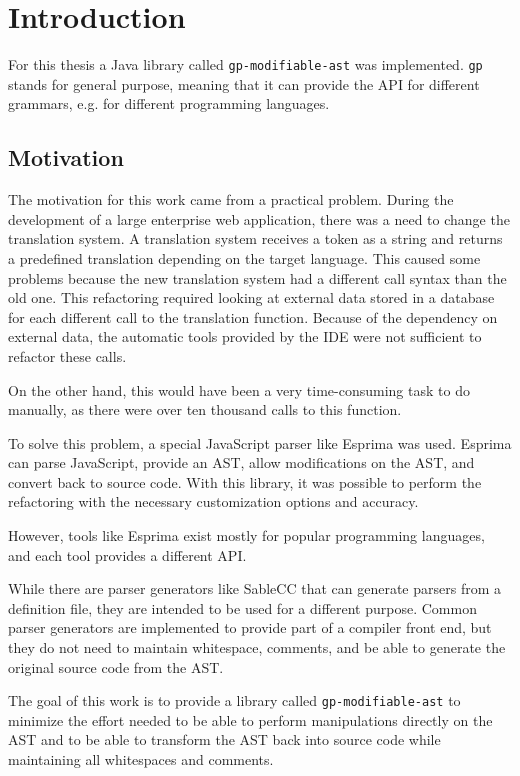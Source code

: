 \section{Introduction}

For this thesis a Java library called \verb|gp-modifiable-ast| was implemented. 
\verb|gp| stands for general purpose, meaning that it can provide the API for different grammars, e.g. for different programming languages.

\subsection{Motivation}

The motivation for this work came from a practical problem. 
During the development of a large enterprise web application, there was a need to change the translation system.
A translation system receives a token as a string and returns a predefined translation depending on the target language.
This caused some problems because the new translation system had a different call syntax than the old one.
This refactoring required looking at external data stored in a database for each different call to the translation function.
Because of the dependency on external data, the automatic tools provided by the IDE were not sufficient to refactor these calls.

On the other hand, this would have been a very time-consuming task to do manually, as there were over ten thousand calls to this function.

To solve this problem, a special JavaScript parser like Esprima \cite{esprima} was used. 
Esprima can parse JavaScript, provide an AST, allow modifications on the AST, and convert back to source code.
With this library, it was possible to perform the refactoring with the necessary customization options and accuracy.

However, tools like Esprima exist mostly for popular programming languages, and each tool provides a different API.

While there are parser generators like SableCC \cite{sablecc} that can generate parsers from a definition file, they are intended to be used for a different
purpose.
Common parser generators are implemented to provide part of a compiler front end, but they do not need to maintain whitespace,
comments, and be able to generate the original source code from the AST.

The goal of this work is to provide a library called \verb|gp-modifiable-ast| to minimize the effort needed to be able to perform 
manipulations directly on the AST and
to be able to transform the AST back into source code while maintaining all whitespaces and comments.

